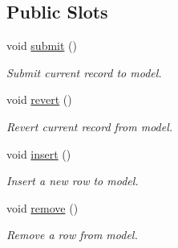 \subsection*{Public Slots}
\begin{DoxyCompactItemize}
\item 
void \hyperlink{classmdt_abstract_sql_table_controller_a14f3e2a91fc30ca0e018944f4f95bc33}{submit} ()
\begin{DoxyCompactList}\small\item\em Submit current record to model. \end{DoxyCompactList}\item 
void \hyperlink{classmdt_abstract_sql_table_controller_a36af2665b6d742aba3bc7f6ee6b2a6c4}{revert} ()
\begin{DoxyCompactList}\small\item\em Revert current record from model. \end{DoxyCompactList}\item 
void \hyperlink{classmdt_abstract_sql_table_controller_a82e88e4ff610f73b629bb6d2f229d1aa}{insert} ()
\begin{DoxyCompactList}\small\item\em Insert a new row to model. \end{DoxyCompactList}\item 
void \hyperlink{classmdt_abstract_sql_table_controller_a7bbe0f951403acbcc01c99f5916b9204}{remove} ()
\begin{DoxyCompactList}\small\item\em Remove a row from model. \end{DoxyCompactList}\end{DoxyCompactItemize}
